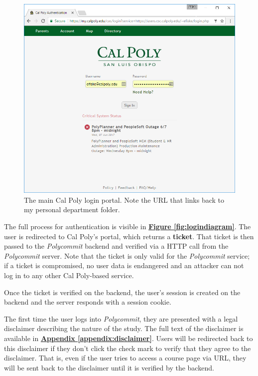 \begin{figure}[h]
	\includegraphics[width=1.0\linewidth]{figures/onboarding-portal}
	\caption{The main Cal Poly login portal. Note the URL that links back to my personal department folder.}
	\label{fig:onboarding1}
\end{figure}

\par The full process for authentication is visible in \textbf{\hyperref[fig:logindiagram]{Figure \ref*{fig:logindiagram}}}. The user is redirected to Cal Poly's portal, which returns a \textbf{ticket}. That ticket is then passed to the \textit{Polycommit} backend and verified via a HTTP call from the \textit{Polycommit} server. Note that the ticket is only valid for the \textit{Polycommit} service; if a ticket is compromised, no user data is endangered and an attacker can not log in to any other Cal Poly-based service.

\par Once the ticket is verified on the backend, the user's session is created on the backend and the server responds with a session cookie.

\par The first time the user logs into \textit{Polycommit}, they are presented with a legal disclaimer describing the nature of the study. The full text of the disclaimer is available in \textbf{\hyperref[appendix:disclaimer]{Appendix \ref*{appendix:disclaimer}}}. Users will be redirected back to this disclaimer if they don't click the check mark to verify that they agree to the disclaimer. That is, even if the user tries to access a course page via URL, they will be sent back to the disclaimer until it is verified by the backend.

